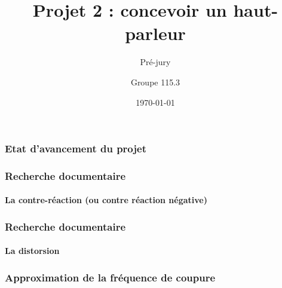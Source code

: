 \documentclass[pdf]{beamer}
\title{Projet 2 : concevoir un haut-parleur}
\subtitle{Pré-jury}
\author{Groupe 115.3}
\date{\today}
\begin{document}
\begin{frame}
	\titlepage
\end{frame}

\begin{frame}
	\frametitle{Etat d'avancement du projet}	

\end{frame}

\begin{frame}
	\frametitle{Recherche documentaire}
	\framesubtitle{La contre-réaction (ou contre réaction négative)}
	 
\end{frame}

\begin{frame}
	\frametitle{Recherche documentaire}
	\framesubtitle{La distorsion}
\end{frame}
	
\begin{frame}
	\frametitle{Approximation de la fréquence de coupure}
\end{frame}
\end{document}
